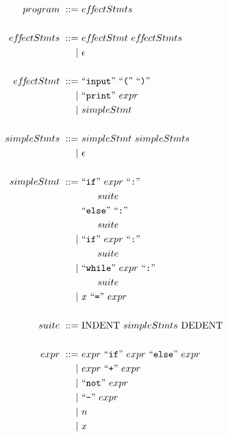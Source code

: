 \documentclass[sigplan, review]{acmart}
\begin{document}
\begin{align*}
program         \ ::=&\ ef\!f\!ectStmts\\\\
ef\!f\!ectStmts \ ::=&\ ef\!f\!ectStmt\ ef\!f\!ectStmts \\
                    |&\ \epsilon \\\\
ef\!f\!ectStmt  \ ::=&\ \text{``\texttt{input}''}\ \text{``\texttt{(}''}\ \text{``\texttt{)}''}\\
                    |&\ \text{``\texttt{print}''}\ expr\\
                    |&\ simpleStmt\\\\
simpleStmts     \ ::=&\ simpleStmt\ simpleStmts \\
                    |&\ \epsilon \\\\
simpleStmt      \ ::=&\ \text{``\texttt{if}''}\ expr\ \text{``\texttt{:}''}\\
                     &\qquad suite\\
                     &\ \text{``\texttt{else}''}\ \text{``\texttt{:}''}\\
                     &\qquad suite\\
                    |&\ \text{``\texttt{if}''}\ expr\ \text{``\texttt{:}''}\\
                     &\qquad suite\\
                    |&\ \text{``\texttt{while}''}\ expr\ \text{``\texttt{:}''}\\\
                     &\qquad suite\\
                    |&\ x\ \text{``\texttt{=}''}\ expr\\\\
suite           \ ::=&\ \text{INDENT}\ simpleStmts\ \text{DEDENT}\\\\
expr            \ ::=&\ expr\ \text{``\texttt{if}''}\ expr\ \text{``\texttt{else}''}\ expr\\
                    |&\ expr\ \text{``\texttt{+}''}\ expr\\
                    |&\ \text{``\texttt{not}''}\ expr\\
                    |&\ \text{``\texttt{-}''}\ expr\\
                    |&\ n\\
                    |&\ x
\end{align*}
\end{document}
